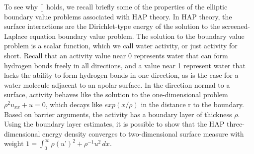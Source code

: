 \documentclass[12pt]{article}
\begin{document}
To see why \eqref{} holds, we recall briefly some of the properties of the elliptic boundary value problems associated with HAP theory. In HAP theory, the surface interactions are the Dirichlet-type energy of the solution to the screened-Laplace equation boundary value problem. The solution to the boundary value problem is a scalar function, which we call water activity, or just activity for short. Recall that an activity value near 0 represents water that can form hydrogen bonds freely in all directions, and a value near 1 represent water that lacks the ability to form hydrogen bonds in one direction, as is the case for a water molecule adjacent to an apolar surface.
In the direction normal to a surface, activity behaves like the solution to the one-dimensional problem $\rho^2 u_{xx} + u = 0$, which decays like $exp(x/\rho)$ in the distance r to the boundary. Based on barrier arguments, the activity has a boundary layer of thickness $\rho$. Using the boundary layer estimates, it is possible to show that the HAP three-dimensional energy density converges to two-dimensional surface measure with weight $1 = \int_0^{\infty} \rho (u’)^2 + \rho^{-1} u^2 \,d x$. 
\end{document}
